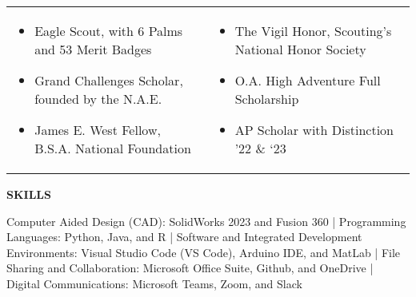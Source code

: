 \documentclass[18pt]{article}
\begin{document}
\begin{tabular}{p{}p{}}

\begin{itemize}[noitemsep]
  \vspace{-\baselineskip}
  \item \hspace{-0.1in} Eagle Scout, with 6 Palms and 53 Merit Badges
  \item \hspace{-0.1in} Grand Challenges Scholar, founded by the N.A.E. 
  \item \hspace{-0.1in} James E. West Fellow, B.S.A. National Foundation
  \vspace{
  
  3}
  \end{itemize}
  &
\begin{itemize}[noitemsep]
  \vspace{-\baselineskip}
  \item The Vigil Honor, Scouting’s National Honor Society 
  \item O.A. High Adventure Full Scholarship
  \item AP Scholar with Distinction ’22 \& ‘23 
  \vspace{-\baselineskip}
  
\end{itemize}\\

\end{tabular}


\begin{center}
    \vspace{-0.5\baselineskip}
    \textbf{SKILLS}
    \hrulefill
\end{center}
\vspace{-1.25\baselineskip}


\justify Computer Aided Design (CAD): SolidWorks 2023 and Fusion 360 | Programming Languages: Python, Java, and R | Software and Integrated Development Environments: Visual Studio Code (VS Code), Arduino IDE, and MatLab | File Sharing and Collaboration: Microsoft Office Suite, Github, and OneDrive | Digital Communications: Microsoft Teams, Zoom, and Slack
\end{document}
